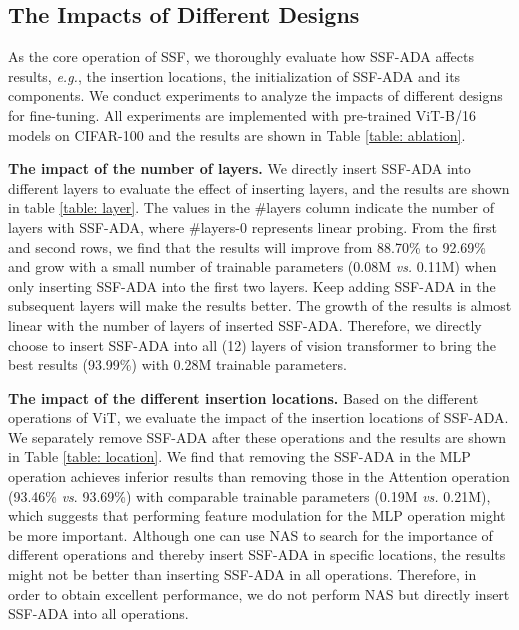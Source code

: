 \subsection{The Impacts of Different Designs}\label{sec: 4.3}

As the core operation of SSF, we thoroughly evaluate how SSF-ADA affects results, \emph{e.g.}, the insertion locations, the initialization of SSF-ADA and its components. We conduct experiments to analyze the impacts of different designs for fine-tuning. All experiments are implemented with pre-trained ViT-B/16 models on CIFAR-100 and the results are shown in Table \ref{table: ablation}. 

\textbf{The impact of the number of layers.} We directly insert SSF-ADA into different layers to evaluate the effect of inserting layers, and the results are shown in table \ref{table: layer}. The values in the \#layers column indicate the number of layers with SSF-ADA, where \#layers-0 represents linear probing. From the first and second rows, we find that the results will improve from 88.70\% to 92.69\% and grow with a small number of trainable parameters (0.08M \emph{vs.} 0.11M) when only inserting SSF-ADA into the first two layers. Keep adding SSF-ADA in the subsequent layers will make the results better. The growth of the results is almost linear with the number of layers of inserted SSF-ADA. Therefore, we directly choose to insert SSF-ADA into all (12) layers of vision transformer to bring the best results (93.99\%) with 0.28M trainable parameters.

\textbf{The impact of the different insertion locations.} Based on the different operations of ViT, we evaluate the impact of the insertion locations of SSF-ADA. We separately remove SSF-ADA after these operations and the results are shown in Table \ref{table: location}. We find that removing the SSF-ADA in the MLP operation achieves inferior results than removing those in the Attention operation (93.46\% \emph{vs}. 93.69\%) with comparable trainable parameters (0.19M \emph{vs.} 0.21M), which suggests that performing feature modulation for the MLP operation might be more important. Although one can use NAS to search for the importance of different operations and thereby insert SSF-ADA in specific locations, the results might not be better than inserting SSF-ADA in all operations. Therefore, in order to obtain excellent performance, we do not perform NAS but directly insert SSF-ADA into all operations.

